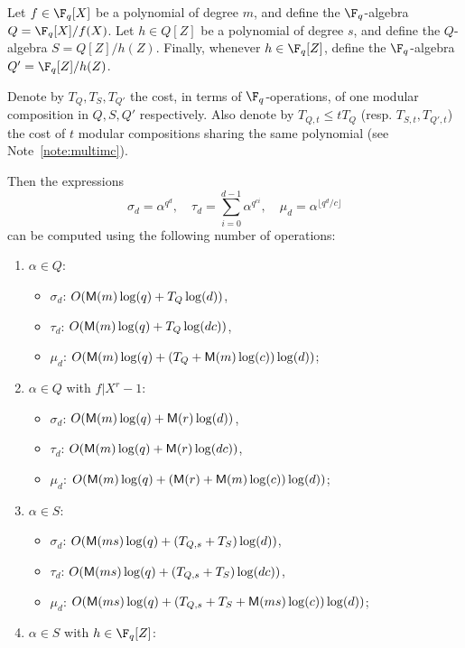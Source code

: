 \begin{proposition}
\label{prop:trace-like}
Let $f \in \F_q[X]$ be a polynomial of degree $m$,
and define the $\F_q$-algebra $Q = \F_q[X]/f(X)$.
Let $h \in Q[Z]$ be a polynomial of degree $s$,
and define the $Q$-algebra $S =  Q[Z]/h(Z)$.
Finally, whenever $h \in \F_q[Z]$, define
the $\F_q$-algebra $Q' = \F_q[Z]/h(Z)$.

Denote by $T_Q, T_S, T_{Q'}$ the cost, in terms of $\F_q$-operations,
of one modular composition in $Q, S, Q'$ respectively. %
Also denote by $T_{Q,t}\le tT_Q$ (resp. $T_{S,t}, T_{Q',t}$) the cost of $t$
modular compositions sharing the same polynomial (see
Note~\ref{note:multimc}).

Then the expressions
\[
\sigma_d= \alpha^{q^d}, \quad \tau_d = \sum_{i=0}^{d-1} \alpha^{q^{ci}}, \quad
\mu_d=\alpha^{\lfloor q^d/c\rfloor}
\]
can be computed using the following number of operations:
\begin{enumerate}[label=\textbf{Case~\theenumi.},leftmargin=*, align=left]
\item $\alpha \in Q$:
\begin{itemize}
\item
$\sigma_d$: $O(\mathsf{M}(m) \log(q) + T_Q \log(d))$,
\item
$\tau_d$: $O(\mathsf{M}(m) \log(q) + T_Q \log(d c))$,
\item
$\mu_d$: $O(\mathsf{M}(m) \log(q) + (T_Q + \mathsf{M}(m)\log(c))\log(d))$;
\end{itemize}
\item $\alpha \in Q$ with $f | X^r - 1$:
\begin{itemize}
\item
$\sigma_d$: $O(\mathsf{M}(m) \log(q) + \mathsf{M}(r) \log(d))$,
\item
$\tau_d$: $O(\mathsf{M}(m) \log(q) + \mathsf{M}(r) \log(d c))$,
\item
$\mu_d$: $O(\mathsf{M}(m) \log(q) + (\mathsf{M}(r) + \mathsf{M}(m)\log(c))\log(d))$;
\end{itemize}
\item $\alpha \in S$:
\begin{itemize}
\item
$\sigma_d$: $O(\mathsf{M}(ms)\log(q) + (T_{Q,s}+T_S)\log(d))$,
\item
$\tau_d$: $O(\mathsf{M}(ms)\log(q) + (T_{Q,s}+T_S)\log(d c))$,
\item
$\mu_d$: $ O(\mathsf{M}(ms)\log(q) + (T_{Q,s}+T_S + \mathsf{M}(ms)\log(c))\log(d))$;
\end{itemize}
\item $\alpha \in S$ with $h \in \F_q[Z]$:
\begin{itemize}

\end{itemize}
\end{enumerate}
\end{proposition}
